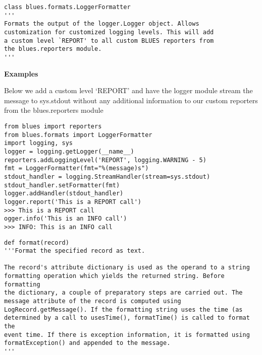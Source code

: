 \begin{description}
\begin{verbatim}
class blues.formats.LoggerFormatter
'''
Formats the output of the logger.Logger object. Allows
customization for customized logging levels. This will add
a custom level `REPORT' to all custom BLUES reporters from
the blues.reporters module.
'''
\end{verbatim}

\begin{description}
\item
    \textbf{Examples}

Below we add a custom level `REPORT' and have the logger module stream
the message to sys.stdout without any additional information to our
custom reporters from the blues.reporters module

\begin{verbatim}
from blues import reporters
from blues.formats import LoggerFormatter
import logging, sys
logger = logging.getLogger(__name__)
reporters.addLoggingLevel('REPORT', logging.WARNING - 5)
fmt = LoggerFormatter(fmt="%(message)s")
stdout_handler = logging.StreamHandler(stream=sys.stdout)
stdout_handler.setFormatter(fmt)
logger.addHandler(stdout_handler)
logger.report('This is a REPORT call')
>>> This is a REPORT call
ogger.info('This is an INFO call')
>>> INFO: This is an INFO call
\end{verbatim}
\end{description}

\begin{description}
\begin{verbatim}
def format(record)
'''Format the specified record as text.

The record's attribute dictionary is used as the operand to a string
formatting operation which yields the returned string. Before formatting
the dictionary, a couple of preparatory steps are carried out. The
message attribute of the record is computed using
LogRecord.getMessage(). If the formatting string uses the time (as
determined by a call to usesTime(), formatTime() is called to format the
event time. If there is exception information, it is formatted using
formatException() and appended to the message.
'''
\end{verbatim}
\end{description}
\end{description}

